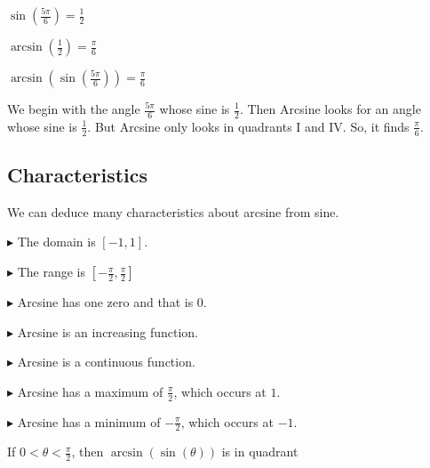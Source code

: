 \documentclass{ximera}
\begin{document}
\begin{example}



$\sin\left(\frac{5\pi}{6}\right) = \frac{1}{2}$

$\arcsin\left(\frac{1}{2}\right) = \frac{\pi}{6}$


$\arcsin\left(\sin\left(\frac{5\pi}{6}\right)\right) = \frac{\pi}{6}$




We begin with the angle $\frac{5\pi}{6}$ whose sine is $\frac{1}{2}$.  Then Arcsine looks for an angle whose sine is $\frac{1}{2}$.  But Arcsine only looks in quadrants I and IV.  So, it finds $\frac{\pi}{6}$.


\end{example}









\subsection*{Characteristics} 

We can deduce many characteristics about arcsine from sine.


$\blacktriangleright$ The domain is  $[-1, 1]$.


$\blacktriangleright$ The range is $\left[ -\frac{\pi}{2}, \frac{\pi}{2} \right]$


$\blacktriangleright$ Arcsine has one zero and that is $0$.


$\blacktriangleright$ Arcsine is an increasing function.

$\blacktriangleright$ Arcsine is a continuous function.

$\blacktriangleright$ Arcsine has a maximum of $\frac{\pi}{2}$, which occurs at $1$.

$\blacktriangleright$ Arcsine has a minimum of $-\frac{\pi}{2}$, which occurs at $-1$.



\begin{question}


If $0 < \theta < \frac{\pi}{2}$, then $\arcsin(\sin(\theta))$ is in quadrant

\begin{multipleChoice}
\end{multipleChoice}

\end{question}
\end{document}
